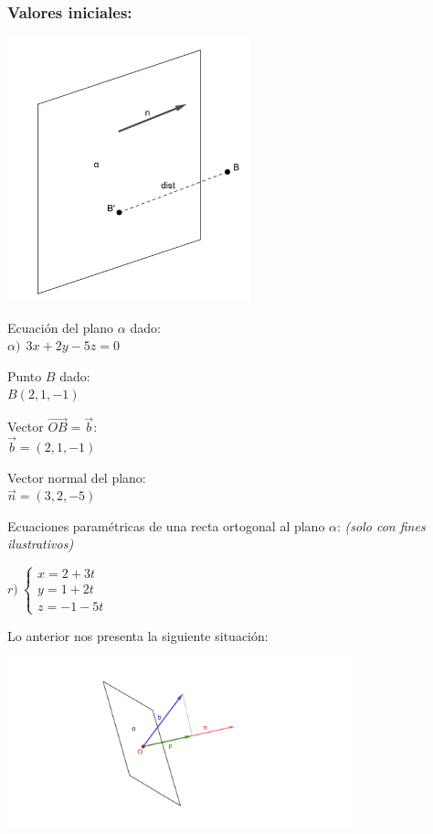 \subsubsection*{Valores iniciales:}
\begin{multicols}{2}
	\includegraphics[width=7cm, scale=0.8]{ej-18/18ini.png}

	\noindent Ecuación del plano $\alpha$ dado: \\
	\indent $\alpha) \ \ 3x + 2y -5z = 0$

	\noindent Punto $B$ dado: \\
	\indent $B(2, 1, -1)$

	\noindent Vector $\overrightarrow{OB} = \vec{b}$: \\
	\indent $\vec{b} = (2, 1, -1)$

	\noindent Vector normal del plano: \\
	\indent $\vec{n}=(3, 2, -5)$

	\noindent Ecuaciones paramétricas de una recta ortogonal al plano $\alpha$: \textit{(solo con fines ilustrativos)}

	$r) \ \begin{cases}
			x = 2 + 3t \\
			y = 1 + 2t \\
			z = -1 - 5t
		\end{cases}$
\end{multicols}

\noindent Lo anterior nos presenta la siguiente situación:

\begin{center}
	\includegraphics[width=10cm, scale=0.8]{ej-18/18ini2.png}
\end{center}

